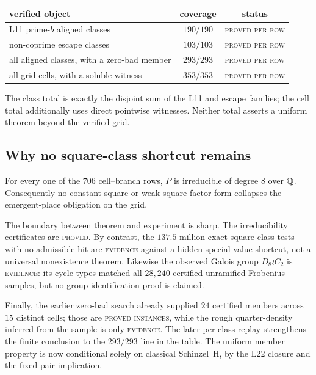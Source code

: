 \begin{center}
\begin{tabular}{lcc}
\hline
verified object & coverage & status\\
\hline
L11 prime-$b$ aligned classes & $190/190$ & \textsc{proved per row}\\ %
non-coprime escape classes & $103/103$ & \textsc{proved per row}\\ %
all aligned classes, with a zero-bad member & $293/293$ & \textsc{proved per row}\\ %
all grid cells, with a soluble witness & $353/353$ & \textsc{proved per row}\\ %
\hline
\end{tabular}
\end{center}
The class total is exactly the disjoint sum of the L11 and escape families;
the cell total additionally uses direct pointwise witnesses.  Neither total
asserts a uniform theorem beyond the verified grid.

\subsection{Why no square-class shortcut remains}

\begin{proposition}
For every one of the $706$ cell--branch rows, $P$ is irreducible of degree
$8$ over $\mathbb{Q}$.  Consequently no constant-square or weak square-factor form
collapses the emergent-place obligation on the grid.
\end{proposition}

The boundary between theorem and experiment is sharp.  The irreducibility
certificates are \textsc{proved}.  By contrast, the $137.5$ million exact
square-class tests with no admissible hit are \textsc{evidence} against a
hidden special-value shortcut, not a universal nonexistence theorem.
Likewise the observed Galois group $D_8\wr C_2$ is \textsc{evidence}: its
cycle types matched all $28{,}240$ certified unramified Frobenius samples,
but no group-identification proof is claimed.

Finally, the earlier zero-bad search already supplied $24$ certified members
across $15$ distinct cells; those are \textsc{proved instances}, while the
rough quarter-density inferred from the sample is only \textsc{evidence}.
The later per-class replay strengthens the finite conclusion to the
$293/293$ line in the table.  The uniform member property is now
conditional solely on classical Schinzel~H, by the L22 closure and the
fixed-pair implication.
